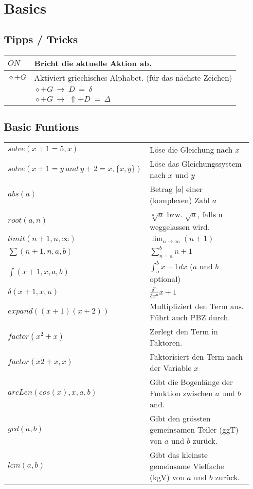 \section{Basics}

\subsection{Tipps / Tricks}
\begin{tabular}{|l|l|}
	\hline
	$ON$			& Bricht die aktuelle Aktion ab. \\ \hline
	$\diamond + G$	& Aktiviert griechisches Alphabet. (für das nächste Zeichen) \\
					& $\diamond+G \: \to \: D \: = \: \delta$ \\
					& $\diamond+G \: \to \: \Uparrow+D \: = \: \Delta$ \\ \hline
\end{tabular}

\subsection{Basic Funtions}
\begin{tabular}{|l|l|}
	\hline
	$solve(x+1=5,x)$									& Löse die Gleichung nach $x$											\\
	$solve(x+1=y \: and \: y+2=x,\{x,y\})$				& Löse das Gleichungssystem nach $x$ und $y$							\\ \hline
	$abs(a)$ 											& Betrag  $|a|$ einer (komplexen) Zahl $a$								\\ \hline
	$root(a,n)$											& $\sqrt[n]{a}$ bzw. $\sqrt{a}$, falls n weggelassen wird.				\\ \hline
	$limit(n+1,n,\infty)$								& $\lim_{n \to \infty}(n+1)$											\\ \hline
	$\sum(n+1,n,a,b)$									& $\sum_{n=a}^b n+1$													\\ \hline
	$\int(x+1,x,a,b)$									& $\int_{a}^b x+1 dx$ ($a$ und $b$ optional)							\\ \hline
	$\delta(x+1,x,n)$									& $\frac{\delta^n}{\delta x^n} x+1$										\\ \hline
	$expand((x+1)(x+2))$								& Multipliziert den Term aus. Führt auch PBZ durch.						\\ \hline
	$factor(x^2+x)$										& Zerlegt den Term in Faktoren.											\\ 
	$factor(x2 +x,x)$									& Faktorisiert den Term nach der Variable $x$							\\ \hline
	$arcLen(cos(x),x,a,b)$								& Gibt die Bogenlänge der Funktion zwischen $a$ und $b$ and. \\ \hline
	$gcd(a,b)$											& Gibt den grössten gemeinsamen Teiler (ggT) von $a$ und $b$ zurück.	\\ \hline
	$lcm(a,b)$											& Gibt das kleinste gemeinsame Vielfache (kgV) von $a$ und $b$ zurück.	\\ \hline
\end{tabular}

